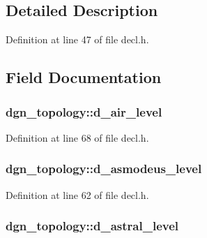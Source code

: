 \subsection{Detailed Description}


Definition at line 47 of file decl.\+h.



\subsection{Field Documentation}
\hypertarget{structdgn__topology_a34d0adfc35f91b9a8fa5bb0515c2ca94}{
\subsubsection[{d\+\_\+air\+\_\+level}]{ dgn\+\_\+topology\+::d\+\_\+air\+\_\+level}}\label{structdgn__topology_a34d0adfc35f91b9a8fa5bb0515c2ca94}


Definition at line 68 of file decl.\+h.

\hypertarget{structdgn__topology_aacf7daa279e3ce9d66dacd8536b8e0bc}{
\subsubsection[{d\+\_\+asmodeus\+\_\+level}]{ dgn\+\_\+topology\+::d\+\_\+asmodeus\+\_\+level}}\label{structdgn__topology_aacf7daa279e3ce9d66dacd8536b8e0bc}


Definition at line 62 of file decl.\+h.

\hypertarget{structdgn__topology_a6b2c67ff3d01dc1cea1b20c5486c749d}{
\subsubsection[{d\+\_\+astral\+\_\+level}]{ dgn\+\_\+topology\+::d\+\_\+astral\+\_\+level}}\label{structdgn__topology_a6b2c67ff3d01dc1cea1b20c5486c749d}


